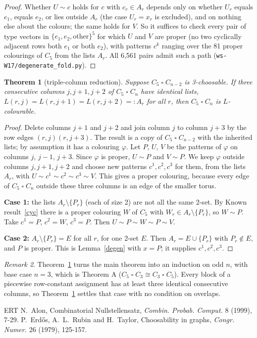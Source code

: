 \documentclass[11pt]{article}
\theoremstyle{plain}
\newtheorem{theorem}{Theorem}
\theoremstyle{definition}
\theoremstyle{remark}
\newtheorem{remark}[theorem]{Remark}
\newcommand{\T}{\mathbin{\square}}
\begin{document}
\begin{proof}
Whether $U \sim c$ holds for $c$ with $c_r \in A_r$ depends only on whether $U_r$ equals $e_1$, equals $e_2$, or lies
outside $A_r$ (the case $U_r = x_r$ is excluded), and on nothing else about the colours; the same holds for $V$.
So it suffices to check every pair of type vectors in $\{e_1, e_2, \text{other}\}^5$ for which $U$ and $V$ are proper
(no two cyclically adjacent rows both $e_1$ or both $e_2$), with patterns $c^k$ ranging over the 81 proper
colourings of $C_5$ from the lists $A_r$. All 6{,}561 pairs admit such a path (\texttt{ws-W17/degenerate\_fold.py}).
\end{proof}

\begin{theorem}[triple-column reduction]\label{triple}
Suppose $C_5 \T C_{n-2}$ is 3-choosable. If three consecutive columns $j, j+1, j+2$ of $C_5 \T C_n$ have identical
lists, $L(r, j) = L(r, j+1) = L(r, j+2) =: A_r$ for all $r$, then $C_5 \T C_n$ is $L$-colourable.
\end{theorem}

\begin{proof}
Delete columns $j+1$ and $j+2$ and join column $j$ to column $j+3$ by the row edges $(r, j)(r, j+3)$. The result
is a copy of $C_5 \T C_{n-2}$ with the inherited lists; by assumption it has a colouring $\varphi$. Let $P$, $U$, $V$
be the patterns of $\varphi$ on columns $j$, $j-1$, $j+3$. Since $\varphi$ is proper, $U \sim P$ and $V \sim P$. We keep
$\varphi$ outside columns $j, j+1, j+2$ and choose new patterns $c^1, c^2, c^3$ for them, from the lists $A_r$, with
$U \sim c^1 \sim c^2 \sim c^3 \sim V$. This gives a proper colouring, because every edge of $C_5 \T C_n$ outside these
three columns is an edge of the smaller torus.

\textbf{Case 1:} the lists $A_r \setminus \{P_r\}$ (each of size 2) are not all the same 2-set. By Known
result~\ref{cyc} there is a proper colouring $W$ of $C_5$ with $W_r \in A_r \setminus \{P_r\}$, so $W \sim P$. Take
$c^1 = P$, $c^2 = W$, $c^3 = P$. Then $U \sim P \sim W \sim P \sim V$.

\textbf{Case 2:} $A_r \setminus \{P_r\} = E$ for all $r$, for one 2-set $E$. Then $A_r = E \cup \{P_r\}$ with $P_r \notin E$,
and $P$ is proper. This is Lemma~\ref{degen} with $x = P$; it supplies $c^1, c^2, c^3$.
\end{proof}

\begin{remark}
Theorem~\ref{triple} turns the main theorem into an induction on odd $n$, with base case $n = 3$, which is
Theorem A ($C_5 \T C_3 \cong C_3 \T C_5$). Every block of a piecewise row-constant assignment has at least three
identical consecutive columns, so Theorem~\ref{triple} settles that case with no condition on overlaps.
\end{remark}

\begin{thebibliography}{ERT}
 N.~Alon, Combinatorial Nullstellensatz, \emph{Combin. Probab. Comput.} 8 (1999), 7-29.
 P.~Erd\H{o}s, A.~L.~Rubin and H.~Taylor, Choosability in graphs, \emph{Congr. Numer.} 26 (1979),
125-157.
\end{thebibliography}
\end{document}
